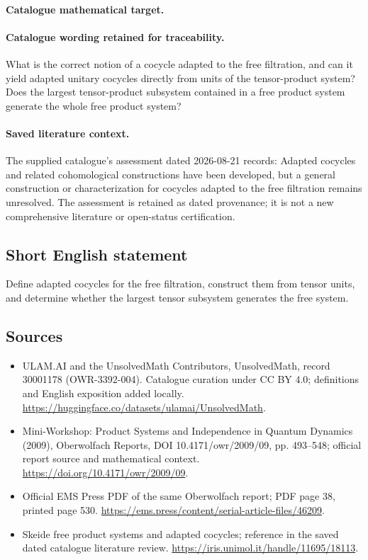 \documentclass[11pt]{article}
\begin{document}
\paragraph{Catalogue mathematical target.}
\paragraph{Catalogue wording retained for traceability.}
What is the correct notion of a cocycle adapted to the free filtration, and can it yield adapted unitary cocycles directly from units of the tensor-product system? Does the largest tensor-product subsystem contained in a free product system generate the whole free product system?

\paragraph{Saved literature context.} The supplied catalogue's assessment dated 2026-08-21 records: Adapted cocycles and related cohomological constructions have been developed, but a general construction or characterization for cocycles adapted to the free filtration remains unresolved. The assessment is retained as dated provenance; it is not a new comprehensive literature or open-status certification.
\subsection{Short English statement}
Define adapted cocycles for the free filtration, construct them from tensor units, and determine whether the largest tensor subsystem generates the free system.
\subsection{Sources}
\begin{itemize}
\item[\hypertarget{source:30001178:1}{S1}] ULAM.AI and the UnsolvedMath Contributors, UnsolvedMath, record 30001178 (OWR-3392-004). Catalogue curation under CC BY 4.0; definitions and English exposition added locally.
\url{https://huggingface.co/datasets/ulamai/UnsolvedMath}.
\item[\hypertarget{source:30001178:2}{S2}] Mini-Workshop: Product Systems and Independence in Quantum Dynamics (2009), Oberwolfach Reports, DOI 10.4171/owr/2009/09, pp. 493--548; official report source and mathematical context.
\url{https://doi.org/10.4171/owr/2009/09}.
\item[\hypertarget{source:30001178:3}{S3}] Official EMS Press PDF of the same Oberwolfach report; PDF page 38, printed page 530.
\url{https://ems.press/content/serial-article-files/46209}.
\item[\hypertarget{source:30001178:4}{S4}] Skeide free product systems and adapted cocycles; reference in the saved dated catalogue literature review.
\url{https://iris.unimol.it/handle/11695/18113}.
\end{itemize}
\label{end:30001178}
\end{document}
